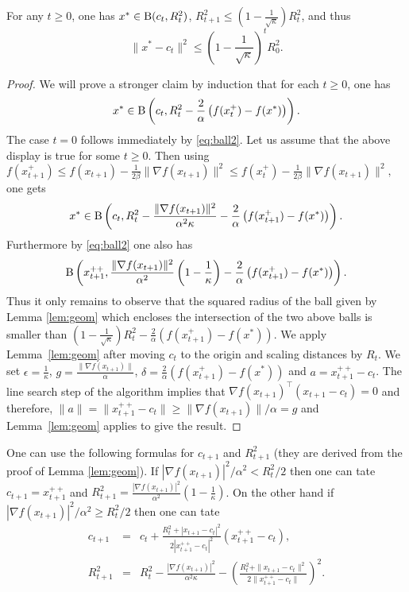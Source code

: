 \begin{theorem}\label{thm:main}
For any $t \geq 0$, one has $x^* \in \mathrm{B}(c_t, R_t^2)$, $R_{t+1}^2 \leq \left(1 - \frac{1}{\sqrt{\kappa}}\right) R_t^2$, and thus
$$\|x^* - c_t\|^2 \leq \left(1 - \frac{1}{\sqrt{\kappa}}\right)^t R_0^2 .$$
\end{theorem}

\begin{proof} 
We will prove a stronger claim by induction that for each $t\geq 0$, one has
$$x^* \in \mathrm{B}\left(c_t, R_t^2 - \frac{2}{\alpha} \left(f(x_t^+) - f(x^*)\right)\right) .$$
The case $t=0$ follows immediately by \eqref{eq:ball2}. Let us assume that the above display is true for some $t \geq 0$. Then using $f(x_{t+1}^+) \leq f(x_{t+1}) - \frac{1}{2\beta} \|\nabla f(x_{t+1})\|^2 \leq f(x_t^+) - \frac{1}{2\beta} \|\nabla f(x_{t+1})\|^2 ,$
one gets
$$x^* \in \mathrm{B}\left(c_t, R_t^2 - \frac{\|\nabla f(x_{t+1})\|^2}{\alpha^2 \kappa} - \frac{2}{\alpha} \left(f(x_{t+1}^+) - f(x^*)\right) \right) .$$
Furthermore by \eqref{eq:ball2} one also has
$$\mathrm{B}\left(x_{t+1}^{++}, \frac{\|\nabla f(x_{t+1})\|^2}{\alpha^2} \left(1 - \frac{1}{\kappa}\right) - \frac{2}{\alpha} \left(f(x_{t+1}^+) - f(x^*)\right) \right).$$
Thus it only remains to observe that the squared radius of the ball given by Lemma \ref{lem:geom} which encloses the intersection of the two above balls is smaller than $\left(1 - \frac{1}{\sqrt{\kappa}}\right) R_t^2 - \frac{2}{\alpha} (f(x_{t+1}^+) - f(x^*))$.
We apply Lemma~\ref{lem:geom} after moving $c_t$ to the origin and scaling distances by $R_t$. We set $\epsilon =\frac{1}{\kappa}$, $g=\frac{\|\nabla f(x_{t+1})\|}{\alpha}$, $\delta=\frac{2}{\alpha}\left(f(x_{t+1}^+)-f(x^*)\right)$ and $a={x_{t+1}^{++}-c_t}$.  The line search step of the algorithm implies that $\nabla f(x_{t+1})^{\top} (x_{t+1} - c_t) = 0$ and therefore, $\|a\|=\|x_{t+1}^{++} - c_t\| \geq \|\nabla f(x_{t+1})\|/\alpha=g$ and Lemma~\ref{lem:geom} applies to give the result.
\end{proof}

One can use the following formulas for $c_{t+1}$ and $R^2_{t+1}$ (they are derived from the proof of Lemma \ref{lem:geom}). If $|\nabla f(x_{t+1})|^2 / \alpha^2 < R_t^2 / 2$ then one can tate $c_{t+1} = x_{t+1}^{++}$ and $R_{t+1}^2 = \frac{|\nabla f(x_{t+1})|^2}{\alpha^2} \left(1 - \frac{1}{\kappa}\right)$. On the other hand if $|\nabla f(x_{t+1})|^2 / \alpha^2 \geq R_t^2 / 2$ then one can tate
\begin{eqnarray*}
c_{t+1} & = & c_t + \frac{R_t^2 + |x_{t+1} - c_t|^2}{2 |x_{t+1}^{++} - c_t|^2} (x_{t+1}^{++} - c_t) , \\
R_{t+1}^2 & = & R_t^2 - \frac{|\nabla f(x_{t+1})|^2}{\alpha^2 \kappa} - \left( \frac{R_t^2 + \|x_{t+1} - c_t\|^2}{2 \|x_{t+1}^{++} - c_t\|}  \right)^2.
\end{eqnarray*}

